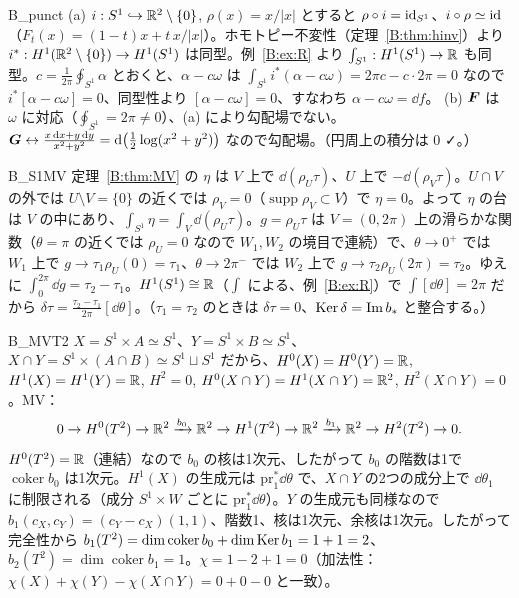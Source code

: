 \begin{soll}{B_punct}
(a) $i:S^1\hookrightarrow\mathbb R^2\setminus\{0\}$, $\rho(x)=x/|x|$ とすると $\rho\circ i=\mathrm{id}_{S^1}$、$i\circ\rho\simeq\mathrm{id}$（$F_t(x)=(1-t)x+t\,x/|x|$）。ホモトピー不変性（定理~\ref{B:thm:hinv}）より $i^*:H^1(\mathbb R^2\setminus\{0\})\to H^1(S^1)$ は同型。例~\ref{B:ex:R} より $\int_{S^1}:H^1(S^1)\to\mathbb R$ も同型。$c=\frac1{2\pi}\oint_{S^1}\alpha$ とおくと、$\alpha-c\omega$ は $\int_{S^1}i^*(\alpha-c\omega)=2\pi c-c\cdot2\pi=0$ なので $i^*[\alpha-c\omega]=0$、同型性より $[\alpha-c\omega]=0$、すなわち $\alpha-c\omega=\dd f$。
(b) $\boldsymbol F$ は $\omega$ に対応（$\oint_{S^1}=2\pi\ne0$）、(a) により勾配場でない。$\boldsymbol G\leftrightarrow\frac{x\,\mathrm{d} x+y\,\mathrm{d} y}{x^2+y^2}=\mathrm{d}\bigl(\tfrac12\log(x^2+y^2)\bigr)$ なので勾配場。（円周上の積分は $0$ ✓。）
\end{soll}

\begin{soll}{B_S1MV}
定理~\ref{B:thm:MV} の $\eta$ は $V$ 上で $\dd(\rho_U\tau)$、$U$ 上で $-\dd(\rho_V\tau)$。$U\cap V$ の外では $U\setminus V=\{0\}$ の近くでは $\rho_V=0$（$\operatorname{supp}\rho_V\subset V$）で $\eta=0$。よって $\eta$ の台は $V$ の中にあり、$\int_{S^1}\eta=\int_V\dd(\rho_U\tau)$。$g=\rho_U\tau$ は $V=(0,2\pi)$ 上の滑らかな関数（$\theta=\pi$ の近くでは $\rho_U=0$ なので $W_1,W_2$ の境目で連続）で、$\theta\to0^+$ では $W_1$ 上で $g\to\tau_1\rho_U(0)=\tau_1$、$\theta\to2\pi^-$ では $W_2$ 上で $g\to\tau_2\rho_U(2\pi)=\tau_2$。ゆえに $\int_0^{2\pi}\dd g=\tau_2-\tau_1$。$H^1(S^1)\cong\mathbb R$（$\int$ による、例~\ref{B:ex:R}）で $\int[\dd\theta]=2\pi$ だから $\delta\tau=\frac{\tau_2-\tau_1}{2\pi}[\dd\theta]$。（$\tau_1=\tau_2$ のときは $\delta\tau=0$、$\operatorname{Ker}\delta=\operatorname{Im} b_*$ と整合する。）
\end{soll}

\begin{soll}{B_MVT2}
$X=S^1\times A\simeq S^1$、$Y=S^1\times B\simeq S^1$、$X\cap Y=S^1\times(A\cap B)\simeq S^1\sqcup S^1$ だから、$H^0(X)=H^0(Y)=\mathbb R$, $H^1(X)=H^1(Y)=\mathbb R$, $H^2=0$, $H^0(X\cap Y)=H^1(X\cap Y)=\mathbb R^2$, $H^2(X\cap Y)=0$。MV：
\[
0\to H^0(T^2)\to\mathbb R^2\xrightarrow{b_0}\mathbb R^2\to H^1(T^2)\to\mathbb R^2\xrightarrow{b_1}\mathbb R^2\to H^2(T^2)\to0 .
\]
$H^0(T^2)=\mathbb R$（連結）なので $b_0$ の核は1次元、したがって $b_0$ の階数は1で $\operatorname{coker}b_0$ は1次元。$H^1(X)$ の生成元は $\mathrm{pr}_1^*\dd\theta$ で、$X\cap Y$ の2つの成分上で $\dd\theta_1$ に制限される（成分 $S^1\times W$ ごとに $\mathrm{pr}_1^*\dd\theta$）。$Y$ の生成元も同様なので $b_1(c_X,c_Y)=(c_Y-c_X)(1,1)$、階数1、核は1次元、余核は1次元。したがって完全性から $b_1(T^2)=\dim\operatorname{coker}b_0+\dim\operatorname{Ker} b_1=1+1=2$、$b_2(T^2)=\dim\operatorname{coker}b_1=1$。$\chi=1-2+1=0$（加法性：$\chi(X)+\chi(Y)-\chi(X\cap Y)=0+0-0$ と一致）。
\end{soll}

